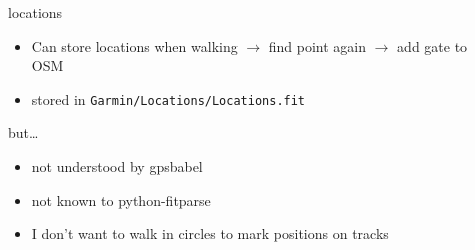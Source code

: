 \documentclass[table,xcolor=dvipsnames,professionalfonts]{beamer}
\begin{document}
\begin{frame}
\begin{columns}
\begin{column}{.5\textwidth}
    \end{column}
    \begin{column}{.5\textwidth}
      \begin{exampleblock}{locations}
        \begin{itemize}
            \item Can store locations when walking
              \newline $\rightarrow$ find point again
              \newline $\rightarrow$ add gate to OSM
            \item stored in {\tiny{\texttt{Garmin/Locations/Locations.fit}}}
        \end{itemize}
      \end{exampleblock}
      \begin{alertblock}{but\dots}
        \begin{itemize}
            \item<2-> not understood by gpsbabel
            \item<3-> not known to python-fitparse
            \item<4-> I don't want to walk in circles to mark positions on tracks
        \end{itemize}
      \end{alertblock}
    \end{column}
  \end{columns}
\end{frame}
\end{document}
